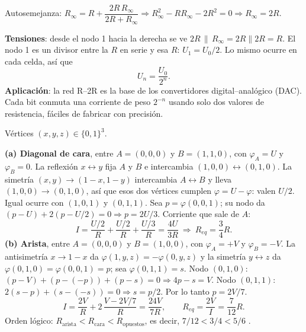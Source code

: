 \begin{center}\end{center}
Autosemejanza: $R_\infty=R+\dfrac{2R\,R_\infty}{2R+R_\infty}\Rightarrow R_\infty^2-RR_\infty-2R^2=0\Rightarrow\boxed{R_\infty=2R}$.

\textbf{Tensiones}: desde el nodo 1 hacia la derecha se ve $2R\,\|\,R_\infty=2R\|2R=R$. El nodo 1 es un divisor entre la $R$ en serie y esa $R$: $U_1=U_0/2$. Lo mismo ocurre en cada celda, así que
\[
\boxed{U_n=\frac{U_0}{2^n}}.
\]
\textbf{Aplicación}: la red R--2R es la base de los convertidores digital--analógico (DAC). Cada bit conmuta una corriente de peso $2^{-n}$ usando solo dos valores de resistencia, fáciles de fabricar con precisión.

Vértices $(x,y,z)\in\{0,1\}^3$.

\textbf{(a) Diagonal de cara}, entre $A=(0,0,0)$ y $B=(1,1,0)$, con $\varphi_A=U$ y $\varphi_B=0$. La reflexión $x\leftrightarrow y$ fija $A$ y $B$ e intercambia $(1,0,0)\leftrightarrow(0,1,0)$. La simetría $(x,y)\to(1-x,1-y)$ intercambia $A\leftrightarrow B$ y lleva $(1,0,0)\to(0,1,0)$, así que esos dos vértices cumplen $\varphi=U-\varphi$: valen $U/2$. Igual ocurre con $(1,0,1)$ y $(0,1,1)$. Sea $p=\varphi(0,0,1)$; su nodo da $(p-U)+2(p-U/2)=0\Rightarrow p=2U/3$. Corriente que sale de $A$:
\[
I=\frac{U/2}{R}+\frac{U/2}{R}+\frac{U/3}{R}=\frac{4U}{3R}\ \Rightarrow\ \boxed{R_{eq}=\frac34R}.
\]
\textbf{(b) Arista}, entre $A=(0,0,0)$ y $B=(1,0,0)$, con $\varphi_A=+V$ y $\varphi_B=-V$. La antisimetría $x\to1-x$ da $\varphi(1,y,z)=-\varphi(0,y,z)$ y la simetría $y\leftrightarrow z$ da $\varphi(0,1,0)=\varphi(0,0,1)=p$; sea $\varphi(0,1,1)=s$.
Nodo $(0,1,0)$: $(p-V)+(p-(-p))+(p-s)=0\Rightarrow4p-s=V$. Nodo $(0,1,1)$: $2(s-p)+(s-(-s))=0\Rightarrow s=p/2$. Por lo tanto $p=2V/7$.
\[
I=\frac{2V}{R}+2\,\frac{V-2V/7}{R}=\frac{24V}{7R},\qquad R_{eq}=\frac{2V}{I}=\boxed{\frac{7}{12}R}.
\]
Orden lógico: $R_{\text{arista}}<R_{\text{cara}}<R_{\text{opuestos}}$, es decir, $7/12<3/4<5/6$ \checkmark.

